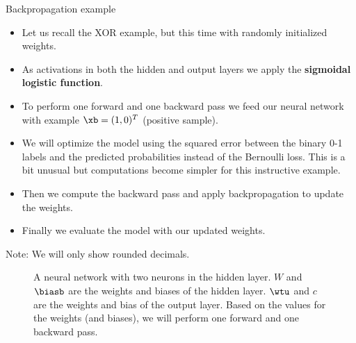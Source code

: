 \begin{vbframe}{Backpropagation example}
  \begin{itemize}
    \item Let us recall the XOR example, but this time with randomly initialized weights.
    \item As activations in both the hidden and output layers we apply the \textbf{sigmoidal logistic function}.
    \item To perform one forward and one backward pass we feed our neural network with example $\xb = (1,0)^T$ (positive sample).
    \item We will optimize the model using the squared error between the binary 0-1 labels and the predicted probabilities instead of the Bernoulli loss. This is
      a bit unusual but computations become simpler for this instructive example.
    \item Then we compute the backward pass and apply backpropagation to update the weights.
    \item Finally we evaluate the model with our updated weights.
  \end{itemize}
\begin{footnotesize}
  Note: We will only show rounded decimals. 
\end{footnotesize}
\framebreak

  \begin{figure}
    \centering
      \caption{A neural network with two neurons in the hidden layer. $W$ and $\biasb$ are the weights and biases of the hidden layer. $\wtu$ and $c$ are the weights and bias of the output layer. Based on the values for the weights (and biases), we will perform one forward and one backward pass.}
  \end{figure}
\end{vbframe} 

